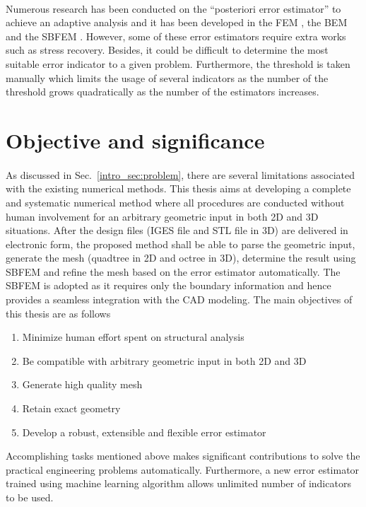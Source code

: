 \paragraph{}
Numerous research has been conducted on the ``posteriori error estimator'' to achieve an adaptive analysis and it has been developed in the FEM \citep{doi:10.1002/nme.1620330702,doi:10.1002/nme.1620330703, BOROOMAND1999127, ZIENKIEWICZ1999111, Ainsworth1993}, the BEM \citep{Zhao1998, Guiggiani1990, KAMIYA1992223} and the SBFEM \citep{NME:NME439}.
However, some of these error estimators require extra works such as stress recovery.
Besides, it could be difficult to determine the most suitable error indicator to a given problem.
Furthermore, the threshold is taken manually which limits the usage of several indicators as the number of the threshold grows quadratically as the number of the estimators increases.



\section{Objective and significance}
\paragraph{}
As discussed in Sec.~\ref{intro_sec:problem}, there are several limitations associated with the existing numerical methods.
This thesis aims at developing a complete and systematic numerical method where all procedures are conducted without human involvement for an arbitrary geometric input in both 2D and 3D situations.
After the design files (IGES file and STL file in 3D) are delivered in electronic form, the proposed method shall be able to parse the geometric input, generate the mesh (quadtree in 2D and octree in 3D), determine the result using SBFEM and refine the mesh based on the error estimator automatically.
The SBFEM is adopted as it requires only the boundary information and hence provides a seamless integration with the CAD modeling.
The main objectives of this thesis are as follows
\begin{enumerate}
    \item Minimize human effort spent on structural analysis
    \item Be compatible with arbitrary geometric input in both 2D and 3D
    \item Generate high quality mesh
    \item Retain exact geometry
    \item Develop a robust, extensible and flexible error estimator
\end{enumerate}
Accomplishing tasks mentioned above makes significant contributions to solve the practical engineering problems automatically.
Furthermore, a new error estimator trained using machine learning algorithm allows unlimited number of indicators to be used.


